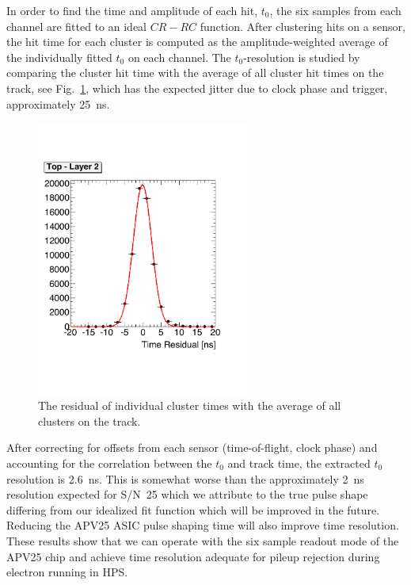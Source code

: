 \documentclass[final,3p,times,twocolumn]{elsarticle}
\begin{document}
In order to find the time and amplitude of each hit, $t_0$,  the six samples from each channel are fitted to 
an ideal $CR-RC$ function. After clustering hits on a sensor, the hit time for each cluster is computed as 
the amplitude-weighted average of the individually fitted $t_0$ on each channel. The $t_0$-resolution is 
studied by comparing the cluster hit time with the average of all cluster hit times on the track, 
see Fig.~\ref{fig:tracktime}, which has the expected jitter due to clock phase and trigger, 
approximately 25~ns. 
\begin{figure}[]
\begin{center}
{\small
	\includegraphics[width=7cm]{figures/test_run_1351_hit_time_corrected_top_layer2_mod.pdf}
	\caption{
	The residual of individual cluster times with the average of all clusters on the track. }
	\label{fig:tracktime}
}
\end{center}
\end{figure}
After correcting for offsets from each sensor (time-of-flight, clock phase) and accounting for the 
correlation between the $t_0$ and track time,  the extracted $t_0$ resolution is 2.6~ns. This is somewhat 
worse than the approximately 2~ns resolution expected for S/N~25 which we attribute to the true 
pulse shape differing from our idealized fit function which will be improved in the future. Reducing the 
APV25 ASIC pulse shaping time will also improve time resolution. 
These results show that we can operate with the six sample readout mode of the APV25 chip and 
achieve time resolution adequate for pileup rejection during electron running in HPS. 
\end{document}
